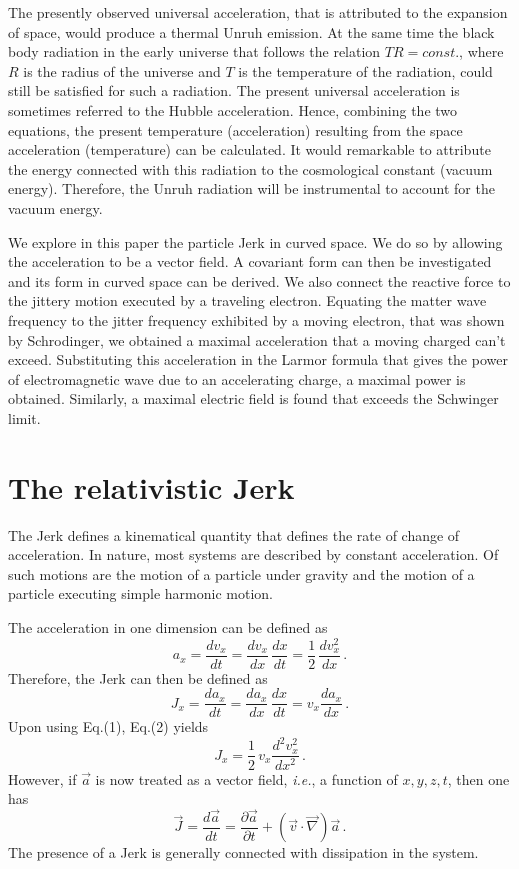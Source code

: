 \documentclass[12pt]{article}
\begin{document}
The presently observed  universal acceleration, that is attributed to  the expansion of space, would produce a thermal Unruh emission. At the same time the black body radiation in the early universe that follows the relation $TR=const.$, where $R$ is the radius of the universe and $T$ is the temperature of the radiation, could still be satisfied for such a radiation. The present universal acceleration is sometimes referred to the Hubble acceleration. Hence, combining the two equations, the present temperature (acceleration)  resulting from the space acceleration (temperature) can be calculated. It would remarkable to attribute the energy connected with this radiation to the cosmological constant (vacuum energy). Therefore, the Unruh radiation will be instrumental to account for the vacuum energy.

We explore in this paper the particle Jerk in curved space. We do so by allowing the acceleration to be a vector field. A covariant form can then be investigated and its form in curved space can be derived. We also connect the reactive force to the jittery motion executed by a traveling  electron. Equating the matter wave frequency to the jitter frequency exhibited by a moving electron,   that was shown by Schrodinger,  we obtained a maximal acceleration that a moving charged can't exceed. Substituting this acceleration in the Larmor formula that gives  the power of electromagnetic wave due to an  accelerating charge, a maximal power is obtained. Similarly,  a maximal  electric field is found that exceeds the Schwinger limit.


\section{{The relativistic Jerk}}

The Jerk defines a kinematical quantity that defines the rate of change of acceleration. In nature, most systems are described by constant acceleration. Of such motions are the  motion of a particle under gravity and the motion of a particle executing simple  harmonic motion.

The acceleration in one dimension can be  defined as
\begin{equation}
a_x=\frac{dv_x}{dt}=\frac{dv_x}{dx}\,\frac{dx}{dt}=\frac{1}{2}\,\frac{dv_x^2}{dx}\,.
 \end{equation}
Therefore, the Jerk can then be defined as
\begin{equation}
J_x=\frac{da_x}{dt}=\frac{da_x}{dx}\,\frac{dx}{dt}=v_x\frac{da_x}{dx}\,.
\end{equation}
Upon using Eq.(1), Eq.(2) yields
\begin{equation}
J_x=\frac{1}{2}\,v_x\frac{d^2v^2_x}{dx^2}\,.
\end{equation}
However, if $\vec{a}$ is now treated as a vector field, \emph{i.e.}, a function of $x, y, z, t$, then one has
\begin{equation}
\vec{J}=\frac{d\vec{a}}{dt}=\frac{\partial\vec{a}}{\partial t}+(\vec{v}\cdot\vec{\nabla})\vec{a}\,.
\end{equation}
The presence of a Jerk is generally connected with dissipation in the system.
\end{document}
